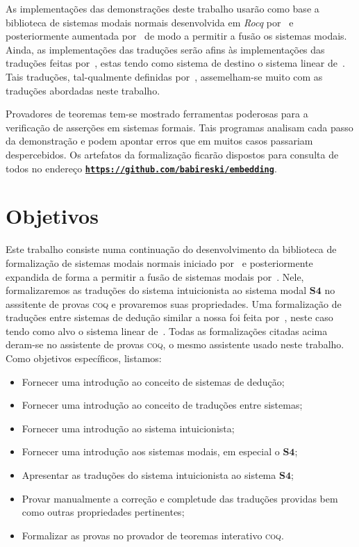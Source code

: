     \vspace{.5\baselineskip}
    As implementações das demonstrações deste trabalho usarão como base a biblioteca de sistemas modais normais desenvolvida em \emph{Rocq} por~\cite{Silveira+others.2022} e posteriormente aumentada por~\cite{Nunes+Roggia+Torrens.2025} de modo a permitir a fusão os sistemas modais.
    Ainda, as implementações das traduções serão afins às implementações das traduções feitas por~\cite{Sehnem.2023}, estas tendo como sistema de destino o sistema linear de~\cite{Girard}.
    Tais traduções, tal-qualmente definidas por~\cite{Girard}, assemelham-se muito com as traduções abordadas neste trabalho.

    \vspace{.5\baselineskip}
    Provadores de teoremas tem-se mostrado ferramentas poderosas para a verificação de asserções em sistemas formais.
    Tais programas analisam cada passo da demonstração e podem apontar erros que em muitos casos passariam despercebidos.
    Os artefatos da formalização ficarão dispostos para consulta de todos no endereço \texttt{\footnotesize\textbf{\url{https://github.com/babireski/embedding}}}.

    \section{Objetivos}
    Este trabalho consiste numa continuação do desenvolvimento da biblioteca de formalização de sistemas modais normais iniciado por~\cite{Silveira} e posteriormente expandida de forma a permitir a fusão de sistemas modais por~\cite{Nunes}. Nele, formalizaremos as traduções do sistema intuicionista ao sistema modal $\mathbf{S4}$ no asssitente de provas \textsc{coq} e provaremos suas propriedades. Uma formalização de traduções entre sistemas de dedução similar a nossa foi feita por~\cite{Sehnem}, neste caso tendo como alvo o sistema linear de~\cite{Girard}. Todas as formalizações citadas acima deram-se no assistente de provas \textsc{coq}, o mesmo assistente usado neste trabalho. Como objetivos específicos, listamos:

    \begin{itemize}
        \item Fornecer uma introdução ao conceito de sistemas de dedução;
        \item Fornecer uma introdução ao conceito de traduções entre sistemas;
        \item Fornecer uma introdução ao sistema intuicionista;
        \item Fornecer uma introdução aos sistemas modais, em especial o $\mathbf{S4}$;
        \item Apresentar as traduções do sistema intuicionista ao sistema $\mathbf{S4}$;
        \item Provar manualmente a correção e completude das traduções providas bem como outras propriedades pertinentes;
        \item Formalizar as provas no provador de teoremas interativo \textsc{coq}.
    \end{itemize}

